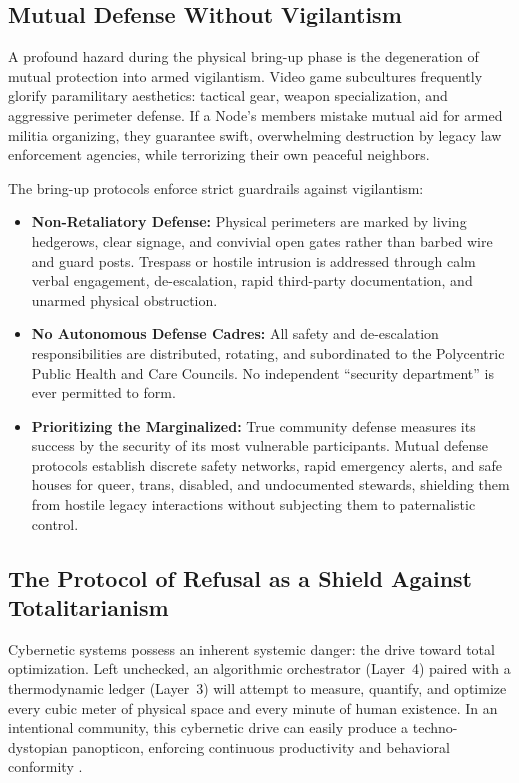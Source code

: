\subsection{Mutual Defense Without Vigilantism}

A profound hazard during the physical bring-up phase is the degeneration of mutual protection into armed vigilantism. Video game subcultures frequently glorify paramilitary aesthetics: tactical gear, weapon specialization, and aggressive perimeter defense. If a Node's members mistake mutual aid for armed militia organizing, they guarantee swift, overwhelming destruction by legacy law enforcement agencies, while terrorizing their own peaceful neighbors.

The bring-up protocols enforce strict guardrails against vigilantism:
\begin{itemize}
    \item \textbf{Non-Retaliatory Defense:} Physical perimeters are marked by living hedgerows, clear signage, and convivial open gates rather than barbed wire and guard posts. Trespass or hostile intrusion is addressed through calm verbal engagement, de-escalation, rapid third-party documentation, and unarmed physical obstruction.
    \item \textbf{No Autonomous Defense Cadres:} All safety and de-escalation responsibilities are distributed, rotating, and subordinated to the Polycentric Public Health and Care Councils. No independent ``security department'' is ever permitted to form.
    \item \textbf{Prioritizing the Marginalized:} True community defense measures its success by the security of its most vulnerable participants. Mutual defense protocols establish discrete safety networks, rapid emergency alerts, and safe houses for queer, trans, disabled, and undocumented stewards, shielding them from hostile legacy interactions without subjecting them to paternalistic control.
\end{itemize}

\subsection{The Protocol of Refusal as a Shield Against Totalitarianism}

Cybernetic systems possess an inherent systemic danger: the drive toward total optimization. Left unchecked, an algorithmic orchestrator (Layer~4) paired with a thermodynamic ledger (Layer~3) will attempt to measure, quantify, and optimize every cubic meter of physical space and every minute of human existence. In an intentional community, this cybernetic drive can easily produce a techno-dystopian panopticon, enforcing continuous productivity and behavioral conformity \parencite{han2015, zuboff2019}.

